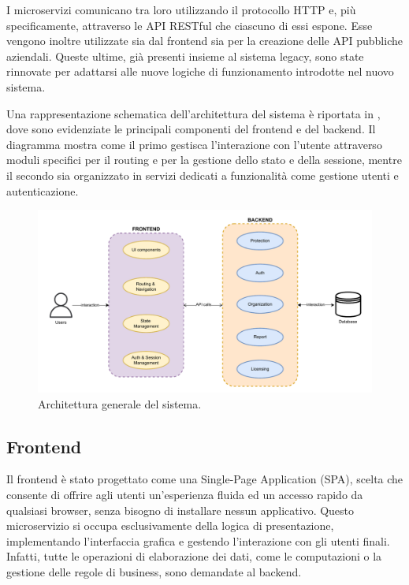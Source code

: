 I microservizi comunicano tra loro utilizzando il protocollo HTTP e, più specificamente, attraverso le API RESTful che ciascuno di essi espone. Esse vengono inoltre utilizzate sia dal frontend sia per la creazione delle API pubbliche aziendali. Queste ultime, già presenti insieme al sistema legacy, sono state rinnovate per adattarsi alle nuove logiche di funzionamento introdotte nel nuovo sistema.

Una rappresentazione schematica dell'architettura del sistema è riportata in , dove sono evidenziate le principali componenti del frontend e del backend. Il diagramma mostra come il primo gestisca l'interazione con l'utente attraverso moduli specifici per il routing e per la gestione dello stato e della sessione, mentre il secondo sia organizzato in servizi dedicati a funzionalità come gestione utenti e autenticazione.

\begin{figure}
  \centering
  \includegraphics[width=1\textwidth]{figures/system-architecture.pdf}
  \caption{Architettura generale del sistema.}
  \label{fig:system-architecture}
\end{figure}

\subsection{Frontend}
Il frontend è stato progettato come una Single-Page Application (SPA), scelta che consente di offrire agli utenti un'esperienza fluida ed un accesso rapido da qualsiasi browser, senza bisogno di installare nessun applicativo. Questo microservizio si occupa esclusivamente della logica di presentazione, implementando l'interfaccia grafica e gestendo l'interazione con gli utenti finali. Infatti, tutte le operazioni di elaborazione dei dati, come le computazioni o la gestione delle regole di business, sono demandate al backend.

